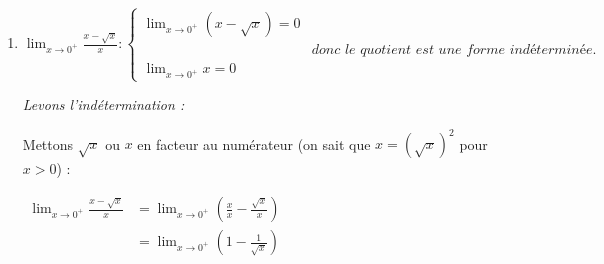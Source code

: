 \documentclass[12pt,a4paper]{article}
\begin{document}
\begin{enumerate}
    \textit{Levons l'indétermination :}
    
    Utilisons l'expression conjuguée du numérateur :
    
    $
    \begin{aligned}
    \displaystyle \lim_{x \to 1} \frac{\sqrt{x + 3} - \sqrt{2x + 2}}{x - 1} &= \displaystyle \lim_{x \to 1} \frac{(\sqrt{x + 3} - \sqrt{2x + 2})(\sqrt{x + 3} + \sqrt{2x + 2})}{(x - 1)(\sqrt{x + 3} + \sqrt{2x + 2})}\\
    &= \displaystyle \lim_{x \to 1} \frac{(\sqrt{x + 3})^2 - (\sqrt{2x + 2})^2}{(x - 1)(\sqrt{x + 3} + \sqrt{2x + 2})}\\
    &= \displaystyle \lim_{x \to 1} \frac{(x + 3) - (2x + 2)}{(x - 1)(\sqrt{x + 3} + \sqrt{2x + 2})}\\
    &= \displaystyle \lim_{x \to 1} \frac{-x + 1}{(x - 1)(\sqrt{x + 3} + \sqrt{2x + 2})}\\
    &= \displaystyle \lim_{x \to 1} \frac{-(x - 1)}{(x - 1)(\sqrt{x + 3} + \sqrt{2x + 2})}\\
    &= \displaystyle \lim_{x \to 1} \frac{-1}{\sqrt{x + 3} + \sqrt{2x + 2}}\\
    &= \frac{-1}{\sqrt{1 + 3} + \sqrt{2 + 2}}\\
    &= -\frac{1}{4}
    \end{aligned}
    $
    
     

    \vspace{0.6cm}

    \item 
    $
    \displaystyle \lim_{x \to 0^+} \frac{x - \sqrt{x}}{x}:
    \begin{cases}
    \displaystyle \lim_{x \to 0^+} (x - \sqrt{x}) = 0\\[3mm]
    &\textit{donc le quotient est une forme indéterminée.}\\
    \displaystyle \lim_{x \to 0^+} x = 0
    \end{cases}
    $

    \textit{Levons l'indétermination :}
    
    Mettons $\sqrt{x}$ ou $x$ en facteur au numérateur (on sait que $x = (\sqrt{x})^2$ pour $x > 0$) :
    
    $
    \begin{aligned}
    \displaystyle \lim_{x \to 0^+} \frac{x - \sqrt{x}}{x} &= \displaystyle \lim_{x \to 0^+} \left( \frac{x}{x} - \frac{\sqrt{x}}{x} \right)\\
    &= \displaystyle \lim_{x \to 0^+} \left( 1 - \frac{1}{\sqrt{x}} \right)
    \end{aligned}
    $
    

\end{enumerate}
\end{document}
